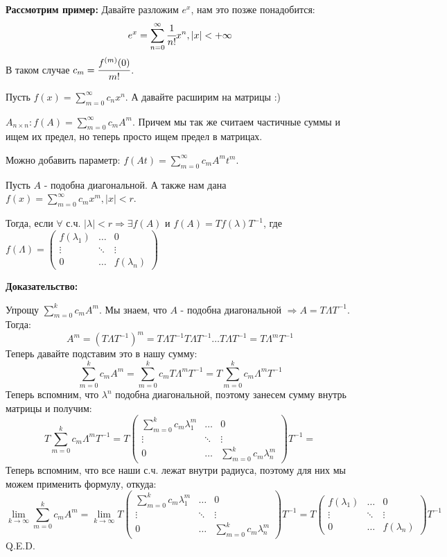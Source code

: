 \textbf{Рассмотрим пример:} Давайте разложим $e^x$, нам это позже понадобится:
$$e^x = \sum\limits_{n=0}^\infty\cfrac{1}{n!}x^n, |x| < + \infty$$
В таком случае $c_m = \cfrac{f^{(m)}(0)}{m!}$.

Пусть $f(x) = \sum\limits_{m=0}^\infty c_n x^n$. А давайте расширим на матрицы :)

 $A_{n\times n}: f(A) = \sum\limits_{m=0}^\infty c_mA^m$. Причем мы так же считаем частичные суммы и ищем их предел, но теперь просто ищем предел в матрицах.

Можно добавить параметр: $f(At) = \sum\limits_{m=0}^\infty c_mA^mt^m$.




Пусть $A$ - подобна диагональной. А также нам дана $f(x) = \sum\limits_{m=0}^\infty c_m x^m, |x|<r$.

Тогда, если $\forall$ с.ч. $|\lambda|< r \Rightarrow \exists f(A)$ и $f(A) = T f(\lambda) T^{-1}$, где
$f(\Lambda) = \begin{pmatrix}
    f(\lambda_1) & \ldots & 0\\
    \vdots & \ddots & \vdots \\
    0 & \ldots &f(\lambda_n)
\end{pmatrix}$

\textbf{Доказательство:}

Упрощу $\sum\limits_{m=0}^k    c_m A^m$. Мы знаем, что $A$ - подобна диагональной $ \Rightarrow A = T \Lambda T^{-1}$.  Тогда:
$$A^m = (T \Lambda T^{-1})^m = T \Lambda T^{-1} T \Lambda T^{-1} \ldots T \Lambda T^{-1} = T \Lambda^m T^{-1}$$
Теперь давайте подставим это в нашу сумму:
$$\sum\limits_{m=0}^k c_m A^m = \sum\limits_{m=0}^k c_mT \Lambda^m T^{-1} = T\sum\limits_{m=0}^k c_m\Lambda^m T^{-1}$$
Теперь вспомним, что $\lambda^n$ подобна диагональной, поэтому занесем сумму внутрь матрицы и получим:
$$T\sum\limits_{m=0}^k c_m\Lambda^m T^{-1} = T \begin{pmatrix}
    \sum\limits_{m=0}^k c_m\lambda_1^m & \ldots & 0 \\
    \vdots  & \ddots & \vdots \\
    0 & \ldots & \sum\limits_{m=0}^k c_m\lambda_n^m
\end{pmatrix}T^{-1} =$$
Теперь вспомним, что все наши с.ч. лежат внутри радиуса, поэтому для них мы можем применить формулу, откуда:
$$\lim\limits_{k\rightarrow\infty}\sum\limits_{m=0}^k    c_m A^m=\lim\limits_{k\rightarrow\infty} T \begin{pmatrix}
    \sum\limits_{m=0}^k c_m\lambda_1^m & \ldots & 0 \\
    \vdots  & \ddots & \vdots \\
    0 & \ldots & \sum\limits_{m=0}^k c_m\lambda_n^m
\end{pmatrix}T^{-1} =T \begin{pmatrix}
    f(\lambda_1) & \ldots & 0 \\
    \vdots  & \ddots & \vdots \\
    0 & \ldots &  f(\lambda_n)
\end{pmatrix}T^{-1}$$
  \hfill Q.E.D.

